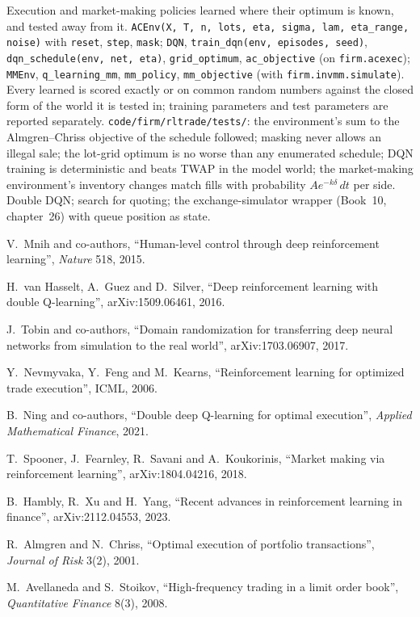 \begin{build}
 Execution and market-making policies learned where their optimum is known, and tested away from it.
 \texttt{ACEnv(X, T, n, lots, eta, sigma, lam, eta\_range, noise)} with \texttt{reset}, \texttt{step},
\texttt{mask}; \texttt{DQN}, \texttt{train\_dqn(env, episodes, seed)}, \texttt{dqn\_schedule(env, net, eta)},
\texttt{grid\_optimum}, \texttt{ac\_objective} (on \texttt{firm.acexec}); \texttt{MMEnv}, \texttt{q\_learning\_mm},
\texttt{mm\_policy}, \texttt{mm\_objective} (with \texttt{firm.invmm.simulate}).
 Every learned  is scored exactly or on common random numbers against the closed form of the world it
is tested in; training parameters and test parameters are reported separately.
 \texttt{code/firm/rltrade/tests/}: the environment's  sum to the Almgren--Chriss objective of
the schedule followed; masking never allows an illegal sale; the lot-grid optimum is no worse than any enumerated schedule;
DQN training is deterministic and beats TWAP in the model world; the market-making environment's inventory changes match
fills with probability $Ae^{-k\delta}\,dt$ per side.
 Double DQN;  search for quoting; the exchange-simulator wrapper (Book~10, chapter~26) with queue
position as state.
\end{build}

\begin{omsources}
\item V.~Mnih and co-authors, ``Human-level control through deep reinforcement learning'', \emph{Nature} 518, 2015.
\item H.~van Hasselt, A.~Guez and D.~Silver, ``Deep reinforcement learning with double Q-learning'', arXiv:1509.06461, 2016.
\item J.~Tobin and co-authors, ``Domain randomization for transferring deep neural networks from simulation to the real
world'', arXiv:1703.06907, 2017.
\item Y.~Nevmyvaka, Y.~Feng and M.~Kearns, ``Reinforcement learning for optimized trade execution'', ICML, 2006.
\item B.~Ning and co-authors, ``Double deep Q-learning for optimal execution'', \emph{Applied Mathematical Finance}, 2021.
\item T.~Spooner, J.~Fearnley, R.~Savani and A.~Koukorinis, ``Market making via reinforcement learning'', arXiv:1804.04216,
2018.
\item B.~Hambly, R.~Xu and H.~Yang, ``Recent advances in reinforcement learning in finance'', arXiv:2112.04553, 2023.
\item R.~Almgren and N.~Chriss, ``Optimal execution of portfolio transactions'', \emph{Journal of Risk} 3(2), 2001.
\item M.~Avellaneda and S.~Stoikov, ``High-frequency trading in a limit order book'', \emph{Quantitative Finance} 8(3), 2008.
\end{omsources}


